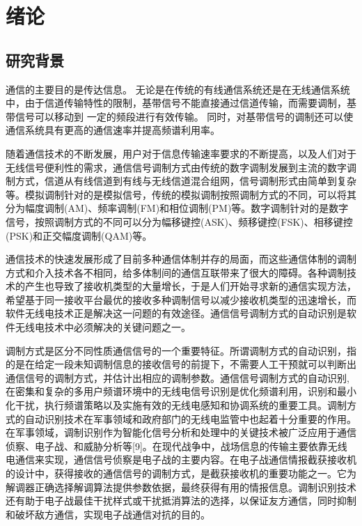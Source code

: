 
\chapter{绪论}
\section{研究背景}
通信的主要目的是传达信息。 无论是在传统的有线通信系统还是在无线通信系统中，由于信道传输特性的限制，基带信号不能直接通过信道传输，而需要调制，基带信号可以移动到 一定的频段进行有效传输。 同时，对基带信号的调制还可以使通信系统具有更高的通信速率并提高频谱利用率。\par

随着通信技术的不断发展，用户对于信息传输速率要求的不断提高，以及人们对于无线信号便利性的需求，通信信号调制方式由传统的数字调制发展到主流的数字调制方式，信道从有线信道到有线与无线信道混合组网，信号调制形式由简单到复杂等。模拟调制针对的是模拟信号，传统的模拟调制按照调制方式的不同，可以将其分为幅度调制(AM)、频率调制(FM)和相位调制(PM)等。数字调制针对的是数字信号，按照调制方式的不同可以分为幅移键控(ASK)、频移键控(FSK)、相移键控(PSK)和正交幅度调制(QAM)等。 \par

通信技术的快速发展形成了目前多种通信体制并存的局面，而这些通信体制的调制方式和介入技术各不相同，给多体制间的通信互联带来了很大的障碍。各种调制技术的产生也导致了接收机类型的大量增长，于是人们开始寻求新的通信实现方法，希望基于同一接收平台最优的接收多种调制信号以减少接收机类型的迅速增长，而软件无线电技术正是解决这一问题的有效途径。通信信号调制方式的自动识别是软件无线电技术中必须解决的关键问题之一。\par

调制方式是区分不同性质通信信号的一个重要特征。所谓调制方式的自动识别，指的是在给定一段未知调制信息的接收信号的前提下，不需要人工干预就可以判断出通信信号的调制方式，并估计出相应的调制参数。通信信号调制方式的自动识别,在密集和复杂的多用户频谱环境中的无线电信号识别是优化频谱利用，识别和最小化干扰，执行频谱策略以及实施有效的无线电感知和协调系统的重要工具。调制方式的自动识别技术在军事领域和政府部门的无线电监管中也起着十分重要的作用。在军事领域，调制识别作为智能化信号分析和处理中的关键技术被广泛应用于通信侦察、电子战、和威胁分析等[9]。在现代战争中，战场信息的传输主要依靠无线电通信来实现，通信信号侦察是电子战的主要内容。在电子战通信情报截获接收机的设计中，获得接收的通信信号的调制方式，是截获接收机的重要功能之一。它为解调器正确选择解调算法提供参数依据，最终获得有用的情报信息。调制识别技术还有助于电子战最佳干扰样式或干扰抵消算法的选择，以保证友方通信，同时抑制和破坏敌方通信，实现电子战通信对抗的目的。\par

